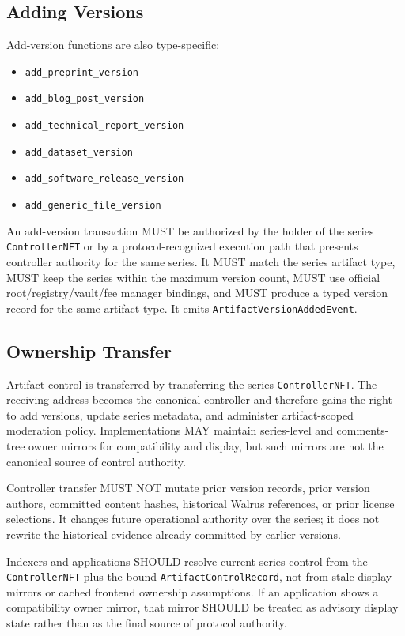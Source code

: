 \documentclass[11pt]{article}
\newcommand{\code}[1]{\texttt{#1}}
\begin{document}
\subsection{Adding Versions}

Add-version functions are also type-specific:

\begin{itemize}[leftmargin=*]
  \item \code{add\_preprint\_version}
  \item \code{add\_blog\_post\_version}
  \item \code{add\_technical\_report\_version}
  \item \code{add\_dataset\_version}
  \item \code{add\_software\_release\_version}
  \item \code{add\_generic\_file\_version}
\end{itemize}

An add-version transaction MUST be authorized by the holder of the series
\code{ControllerNFT} or by a protocol-recognized execution path that presents
controller authority for the same series. It MUST match the series artifact
type, MUST keep the series within the maximum version count, MUST use official
root/registry/vault/fee manager bindings, and MUST produce a typed version
record for the same artifact type. It emits \code{ArtifactVersionAddedEvent}.

\subsection{Ownership Transfer}

Artifact control is transferred by transferring the series \code{ControllerNFT}.
The receiving address becomes the canonical controller and therefore gains the
right to add versions, update series metadata, and administer artifact-scoped
moderation policy. Implementations MAY maintain series-level and comments-tree
owner mirrors for compatibility and display, but such mirrors are not the
canonical source of control authority.

Controller transfer MUST NOT mutate prior version records, prior version
authors, committed content hashes, historical Walrus references, or prior
license selections. It changes future operational authority over the series; it
does not rewrite the historical evidence already committed by earlier versions.

Indexers and applications SHOULD resolve current series control from the
\code{ControllerNFT} plus the bound \code{ArtifactControlRecord}, not from stale
display mirrors or cached frontend ownership assumptions. If an application
shows a compatibility owner mirror, that mirror SHOULD be treated as advisory
display state rather than as the final source of protocol authority.
\end{document}
